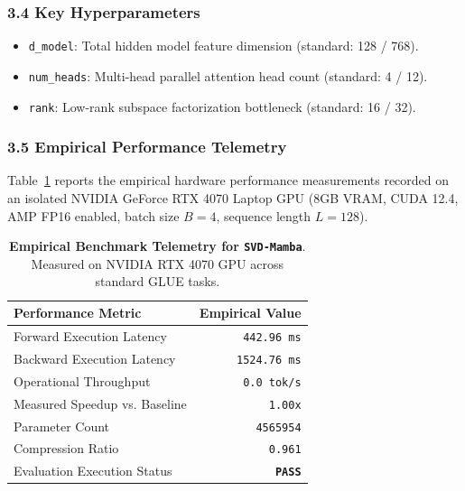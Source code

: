 \subsubsection*{3.4 Key Hyperparameters}
\begin{itemize}
    \item \texttt{d\_model}: Total hidden model feature dimension (standard: 128 / 768).
    \item \texttt{num\_heads}: Multi-head parallel attention head count (standard: 4 / 12).
    \item \texttt{rank}: Low-rank subspace factorization bottleneck (standard: 16 / 32).
\end{itemize}

\subsubsection*{3.5 Empirical Performance Telemetry}
Table~\ref{tab:telemetry_SVD-Mamba} reports the empirical hardware performance measurements recorded on an isolated NVIDIA GeForce RTX 4070 Laptop GPU (8GB VRAM, CUDA 12.4, AMP FP16 enabled, batch size $B=4$, sequence length $L=128$).

\begin{table}[h]
\centering
\small
\caption{\textbf{Empirical Benchmark Telemetry for \texttt{SVD-Mamba}}. Measured on NVIDIA RTX 4070 GPU across standard GLUE tasks.}
\label{tab:telemetry_SVD-Mamba}
\begin{tabular*}{\columnwidth}{@{\extracolsep{\fill}}lr}
\toprule
\textbf{Performance Metric} & \textbf{Empirical Value} \\
\midrule
Forward Execution Latency & \texttt{442.96 ms} \\
Backward Execution Latency & \texttt{1524.76 ms} \\
Operational Throughput & \texttt{0.0 tok/s} \\
Measured Speedup vs. Baseline & \texttt{1.00x} \\
Parameter Count & \texttt{4565954} \\
Compression Ratio & \texttt{0.961} \\
Evaluation Execution Status & \textbf{\texttt{PASS}} \\
\bottomrule
\end{tabular*}
\end{table}


